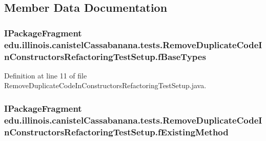 \subsection{Member Data Documentation}
\hypertarget{classedu_1_1illinois_1_1canistelCassabanana_1_1tests_1_1RemoveDuplicateCodeInConstructorsRefactoringTestSetup_a6c6ee1308a16ef2cbdd1a66605a4fbfa}{
\subsubsection[{fBaseTypes}]{\setlength{\rightskip}{0pt plus 5cm}IPackageFragment {\bf edu.illinois.canistelCassabanana.tests.RemoveDuplicateCodeInConstructorsRefactoringTestSetup.fBaseTypes}}}
\label{classedu_1_1illinois_1_1canistelCassabanana_1_1tests_1_1RemoveDuplicateCodeInConstructorsRefactoringTestSetup_a6c6ee1308a16ef2cbdd1a66605a4fbfa}


Definition at line 11 of file RemoveDuplicateCodeInConstructorsRefactoringTestSetup.java.

\hypertarget{classedu_1_1illinois_1_1canistelCassabanana_1_1tests_1_1RemoveDuplicateCodeInConstructorsRefactoringTestSetup_a220aede9c7539af9e2ebef07cbf6ab53}{
\subsubsection[{fExistingMethod}]{\setlength{\rightskip}{0pt plus 5cm}IPackageFragment {\bf edu.illinois.canistelCassabanana.tests.RemoveDuplicateCodeInConstructorsRefactoringTestSetup.fExistingMethod}}}
\label{classedu_1_1illinois_1_1canistelCassabanana_1_1tests_1_1RemoveDuplicateCodeInConstructorsRefactoringTestSetup_a220aede9c7539af9e2ebef07cbf6ab53}


